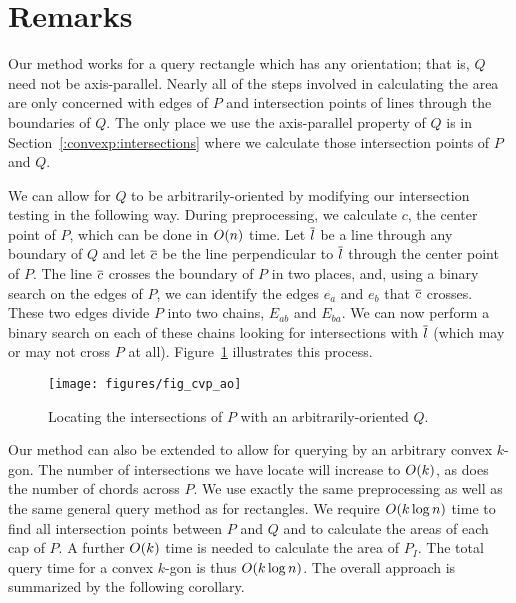 \section{Remarks}
\label{:convexp:remarks}

Our method works for a query rectangle which has any orientation; that is, $Q$ need not be axis-parallel. Nearly all of the steps involved in calculating the area are only concerned with edges of $P$ and intersection points of lines through the boundaries of $Q$. The only place we use the axis-parallel property of $Q$ is in Section~\ref{:convexp:intersections} where we calculate those intersection points of $P$ and $Q$.

We can allow for $Q$ to be arbitrarily-oriented by modifying our intersection testing in the following way.  During preprocessing, we calculate $c$, the center point of $P$, which can be done in $O\!\left(n\right)$ time. Let $\overline{l}$ be a line through any boundary of $Q$ and let $\overline{c}$ be the line perpendicular to $\overline{l}$ through the center point of $P$.  The line $\overline{c}$ crosses the boundary of $P$ in two places, and, using a binary search on the edges of $P$, we can identify the edges $e_a$ and $e_b$ that $\overline{c}$ crosses. These two edges divide $P$ into two chains, $E_{ab}$ and $E_{ba}$. We can now perform a binary search on each of these chains looking for intersections with $\overline{l}$ (which may or may not cross $P$ at all). Figure~\ref{fig:convexp:ao} illustrates this process.

\begin{figure}[t]
\begin{center}
  \texttt{[image: figures/fig\_cvp\_ao]}
  \caption{Locating the intersections of $P$ with an arbitrarily-oriented $Q$.}
  \label{fig:convexp:ao}
\end{center}
\end{figure}

Our method can also be extended to allow for querying by an arbitrary convex $k$-gon.
The number of intersections we have locate will increase to $O\!\left(k\right)$, as does the number of chords across $P$.
We use exactly the same preprocessing as well as the same general query method as for rectangles. 
We require $O\!\left(k \log{n}\right)$ time to find all intersection points between $P$ and $Q$ and to calculate the areas of each cap of $P$. A further $O\!\left(k\right)$ time is needed to calculate the area of $P_I$. 
The total query time for a convex $k$-gon is thus $O\!\left(k \log{n}\right)$.
The overall approach is summarized by the following corollary.

